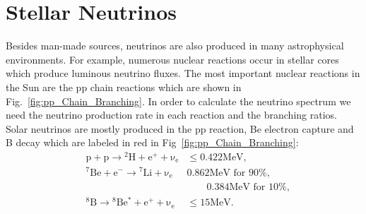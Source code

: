 \section{Stellar Neutrinos}


Besides man-made sources, neutrinos are also produced in many astrophysical environments.%
For example, numerous nuclear reactions occur in stellar cores which produce luminous neutrino fluxes. %
The most important nuclear reactions in the Sun are the pp chain reactions which are shown in Fig.~\ref{fig:pp_Chain_Branching}. In order to calculate the neutrino spectrum we need the neutrino production rate in each reaction and the branching ratios. Solar neutrinos are mostly produced in the pp reaction, Be electron capture and B decay which are labeled in red in Fig~\ref{fig:pp_Chain_Branching}:
\begin{align*}
&\mathrm{p+p\to {}^2H + e^+ +\nu_e}  & \mathrm{\leq 0.422MeV},\\
&\mathrm{{}^7Be + e^- \to {}^7Li + \nu_e} &\text{0.862MeV for 90\%},\\
&&\qquad \text{0.384MeV for 10\%}, \\
&\mathrm{{}^8B \to {}^8Be^* +e^+ +\nu_e}  & \mathrm{\leq 15 MeV}.
\end{align*}




